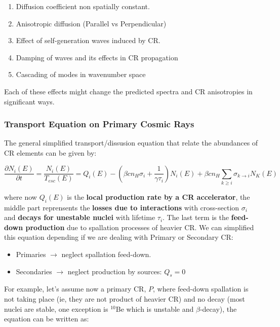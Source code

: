 \documentclass[
  letterpaper,
  DIV=11,
  numbers=noendperiod]{scrreprt}
\providecommand{\tightlist}{%
  \setlength{\itemsep}{0pt}\setlength{\parskip}{0pt}}\usepackage{longtable,booktabs,array}
\begin{document}
\begin{enumerate}
\def\labelenumi{\arabic{enumi}.}
\tightlist
\item
  Diffusion coefficient non spatially constant.
\item
  Anisotropic diffusion (Parallel vs Perpendicular)
\item
  Effect of self-generation waves induced by CR.
\item
  Damping of waves and its effects in CR propagation
\item
  Cascading of modes in wavenumber space
\end{enumerate}

Each of these effects might change the predicted spectra and CR
anisotropies in significant ways.

\subsubsection*{Transport Equation on Primary Cosmic
Rays}\label{transport-equation-on-primary-cosmic-rays}

The general simplified transport/dissusion equation that relate the
abundances of CR elements can be given by:

\[\frac{\partial N_i(E)}{\partial t} =\frac{N_i(E)}{T_{esc}(E)} = Q_i(E) - \left(\beta c n_H \sigma_i + \frac{1}{\gamma\tau_i}\right)N_i(E) + \beta c n_H \sum_{k\ge i}\sigma_{k\rightarrow i}N_K(E)\]

where now \(Q_i(E)\) is the \textbf{local production rate by a CR
accelerator}, the middle part reprensents the \textbf{losses due to
interactions} with cross-section \(\sigma_i\) and \textbf{decays for
unestable nuclei} with lifetime \(\tau_i\). The last term is the
\textbf{feed-down production} due to spallation processes of heavier CR.
We can simplified this equation depending if we are dealing with Primary
or Secondary CR:

\begin{itemize}
\tightlist
\item
  Primaries \(\rightarrow\) neglect spallation feed-down.
\item
  Secondaries \(\rightarrow\) neglect production by sources: \(Q_s = 0\)
\end{itemize}

For example, let's assume now a primary CR, \(P\), where feed-down
spallation is not taking place (ie, they are not product of heavier CR)
and no decay (most nuclei are stable, one exception is \(^{10}\)Be which
is unstable and \(\beta\)-decay), the equation can be written as:
\end{document}
